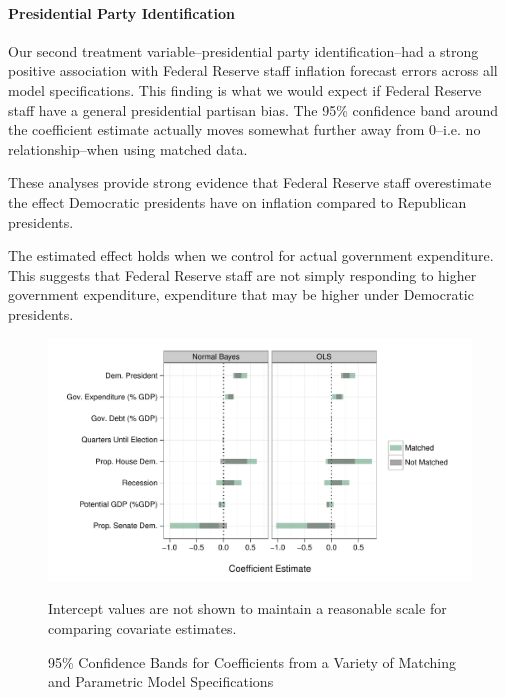\documentclass[a4paper]{article}\usepackage{graphicx, color}
\newenvironment{knitrout}{}{} %
\begin{document}
\paragraph{Presidential Party Identification}

Our second treatment variable--presidential party identification--had a strong positive association with Federal Reserve staff inflation forecast errors across all model specifications. This finding is what we would expect if Federal Reserve staff have a general presidential partisan bias. The 95\% confidence band around the coefficient estimate actually moves somewhat further away from 0--i.e. no relationship--when using matched data.  

These analyses provide strong evidence that Federal Reserve staff overestimate the effect Democratic presidents have on inflation compared to Republican presidents.

The estimated effect holds when we control for actual government expenditure. This suggests that Federal Reserve staff are not simply responding to higher government expenditure, expenditure that may be higher under Democratic presidents.





\begin{figure}[t]
    \caption{95\% Confidence Bands for Coefficients from a Variety of Matching and Parametric Model Specifications}
    \label{CoefComparePlots}
    \begin{center}

\begin{knitrout}
\color{fgcolor}\includegraphics[width=0.95\linewidth]{figure/CoefComparePlots} 
\end{knitrout}

    \end{center}
    \begin{singlespace}
        {\scriptsize{Intercept values are not shown to maintain a reasonable scale for comparing covariate estimates.}}
    \end{singlespace}
\end{figure}
\end{document}
